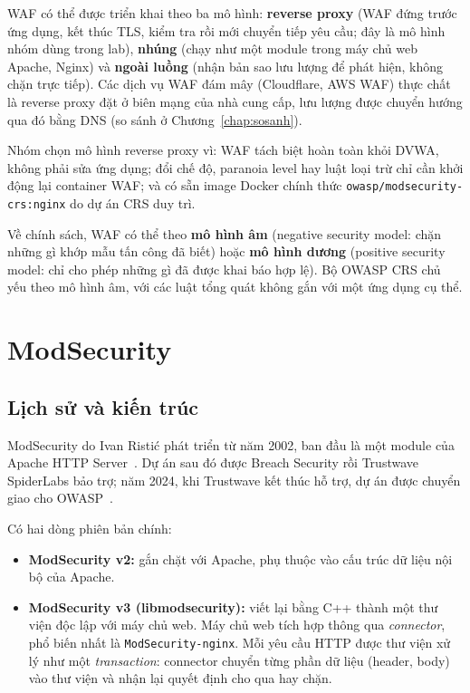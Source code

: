 WAF có thể được triển khai theo ba mô hình: \textbf{reverse proxy} (WAF đứng trước ứng dụng, kết thúc TLS, kiểm tra rồi mới chuyển tiếp yêu cầu; đây là mô hình nhóm dùng trong lab), \textbf{nhúng} (chạy như một module trong máy chủ web Apache, Nginx) và \textbf{ngoài luồng} (nhận bản sao lưu lượng để phát hiện, không chặn trực tiếp). Các dịch vụ WAF đám mây (Cloudflare, AWS WAF) thực chất là reverse proxy đặt ở biên mạng của nhà cung cấp, lưu lượng được chuyển hướng qua đó bằng DNS (so sánh ở Chương~\ref{chap:sosanh}).

Nhóm chọn mô hình reverse proxy vì: WAF tách biệt hoàn toàn khỏi DVWA, không phải sửa ứng dụng; đổi chế độ, paranoia level hay luật loại trừ chỉ cần khởi động lại container WAF; và có sẵn image Docker chính thức \texttt{owasp/modsecurity-crs:nginx} do dự án CRS duy trì.

Về chính sách, WAF có thể theo \textbf{mô hình âm} (negative security model: chặn những gì khớp mẫu tấn công đã biết) hoặc \textbf{mô hình dương} (positive security model: chỉ cho phép những gì đã được khai báo hợp lệ). Bộ OWASP CRS chủ yếu theo mô hình âm, với các luật tổng quát không gắn với một ứng dụng cụ thể.

\section{ModSecurity}
\subsection{Lịch sử và kiến trúc}
ModSecurity do Ivan Ristić phát triển từ năm 2002, ban đầu là một module của Apache HTTP Server~\cite{modsecbook}. Dự án sau đó được Breach Security rồi Trustwave SpiderLabs bảo trợ; năm 2024, khi Trustwave kết thúc hỗ trợ, dự án được chuyển giao cho OWASP~\cite{modsecurity}.

Có hai dòng phiên bản chính:
\begin{itemize}
  \item \textbf{ModSecurity v2:} gắn chặt với Apache, phụ thuộc vào cấu trúc dữ liệu nội bộ của Apache.
  \item \textbf{ModSecurity v3 (libmodsecurity):} viết lại bằng C++ thành một thư viện độc lập với máy chủ web. Máy chủ web tích hợp thông qua \emph{connector}, phổ biến nhất là \texttt{ModSecurity-nginx}. Mỗi yêu cầu HTTP được thư viện xử lý như một \emph{transaction}: connector chuyển từng phần dữ liệu (header, body) vào thư viện và nhận lại quyết định cho qua hay chặn.
\end{itemize}

